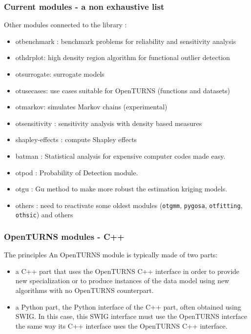 \documentclass[8pt]{beamer}
\begin{document}
  \begin{frame}[containsverbatim]
    \frametitle{Current modules - a non exhaustive list}
    
    \alert{Other modules} connected to the library :
    \begin{itemize}
    \item \alert{otbenchmark} : benchmark problems for reliability and sensitivity analysis
    \item \alert{othdrplot}: high density region algorithm for functional outlier detection
    \item \alert{otsurrogate}: surrogate models
    \item \alert{otusecases}: use cases suitable for OpenTURNS (functions and datasets)
    \item \alert{otmarkov}: simulates Markov chains (experimental)
    \item \alert{otsensitivity} : sensitivity analysis with density based measures
    \item \alert{shapley-effects} : compute Shapley effects
    \item \alert{batman} : Statistical analysis for expensive computer codes made easy.
    \item \alert{otpod} : Probability of Detection module.
    \item \alert{otgu} : Gu method to make more robust the estimation kriging models.
    \item \alert{others} : need to reactivate some oldest modules (\texttt{otgmm}, \texttt{pygosa}, \texttt{otfitting}, \texttt{othsic}) and others
  \end{itemize}
    \end{frame}
    
  
\begin{frame}
  \frametitle{OpenTURNS modules - C++}
  \centering {}
  \begin{block}{The principles}
    An OpenTURNS module is typically made of two parts:
    \begin{itemize}
    \item a C++ part that uses the OpenTURNS C++ interface in order to provide new specialization or to produce instances of the data model using new algorithms with no OpenTURNS counterpart.
    \item a Python part, the Python interface of the C++ part, often obtained using SWIG. In this case, this SWIG interface must use the OpenTURNS interface the same way its C++ interface uses the OpenTURNS C++ interface.
    \end{itemize}
  \end{block}
\end{frame}
\end{document}
